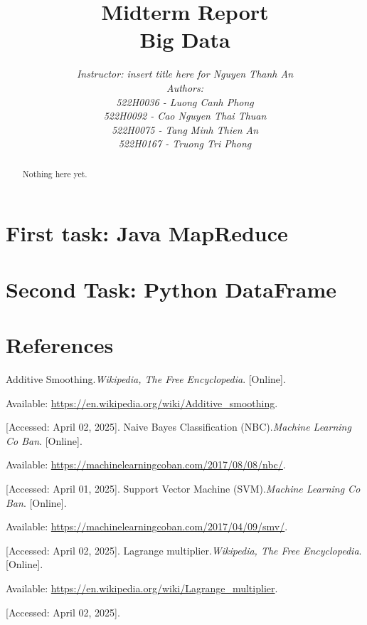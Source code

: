 \documentclass[11pt]{article}
\title{\textbf{
    \Huge
    Midterm Report
    \\[1cm]
    Big Data
}}
\author{
    \textit{Instructor: insert title here for Nguyen Thanh An}
    \\[10cm]
    \textit{Authors:}
    \\
    \textit{522H0036 - Luong Canh Phong}
    \\
    \textit{522H0092 - Cao Nguyen Thai Thuan}
    \\
    \textit{522H0075 - Tang Minh Thien An}
    \\
    \textit{522H0167 - Truong Tri Phong}
}
\date{\vfill\centering{\today}}
\begin{document}
    \maketitle
    \newpage

    \renewcommand{\abstractname}{\Large\uppercase{Abstract}\\[1cm]}
    \begin{abstract}
        \large{
            Nothing here yet.
        }
    \end{abstract}
    \newpage

    \renewcommand{\contentsname}{\centering\textbf{\MakeUppercase{Table of Contents}}}
    \tableofcontents
    \newpage

    \section{First task: Java MapReduce}
    \label{sec:first-task}
    

    \section{Second Task: Python DataFrame}
    \label{sec:second-task}
    
    \newpage

    \section{References}
    \label{sec:references}
    \begin{thebibliography}{99}
         Additive Smoothing.\textit{Wikipedia, The Free Encyclopedia}.
            [Online].

            Available: \url{https://en.wikipedia.org/wiki/Additive_smoothing}.

            [Accessed: April 02, 2025].
         Naive Bayes Classification (NBC).\textit{Machine Learning Co Ban}.
            [Online].

            Available: \url{https://machinelearningcoban.com/2017/08/08/nbc/}.

            [Accessed: April 01, 2025].
         Support Vector Machine (SVM).\textit{Machine Learning Co Ban}.
            [Online].

            Available: \url{https://machinelearningcoban.com/2017/04/09/smv/}.

            [Accessed: April 02, 2025].
         Lagrange multiplier.\textit{Wikipedia, The Free Encyclopedia}.
            [Online].

            Available: \url{https://en.wikipedia.org/wiki/Lagrange_multiplier}.

            [Accessed: April 02, 2025].
    \end{thebibliography}
\end{document}
